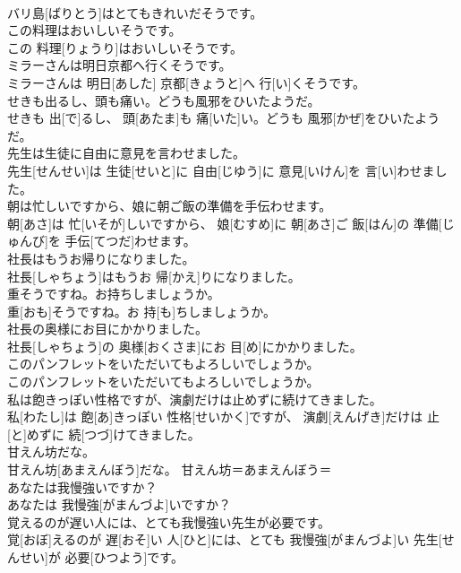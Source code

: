 \documentclass[8pt]{extreport}
\begin{document}
\begin{CJK}{UTF8}{min}
\\	バリ島[ばりとう]はとてもきれいだそうです。	
\\	この料理はおいしいそうです。	
\\	この 料理[りょうり]はおいしいそうです。	
\\	ミラーさんは明日京都へ行くそうです。	
\\	ミラーさんは 明日[あした] 京都[きょうと]へ 行[い]くそうです。	
\\	せきも出るし、頭も痛い。どうも風邪をひいたようだ。	
\\	せきも 出[で]るし、 頭[あたま]も 痛[いた]い。どうも 風邪[かぜ]をひいたようだ。	
\\	先生は生徒に自由に意見を言わせました。	
\\	先生[せんせい]は 生徒[せいと]に 自由[じゆう]に 意見[いけん]を 言[い]わせました。	
\\	朝は忙しいですから、娘に朝ご飯の準備を手伝わせます。	
\\	朝[あさ]は 忙[いそが]しいですから、 娘[むすめ]に 朝[あさ]ご 飯[はん]の 準備[じゅんび]を 手伝[てつだ]わせます。	
\\	社長はもうお帰りになりました。	
\\	社長[しゃちょう]はもうお 帰[かえ]りになりました。	
\\	重そうですね。お持ちしましょうか。	
\\	重[おも]そうですね。お 持[も]ちしましょうか。	
\\	社長の奥様にお目にかかりました。	
\\	社長[しゃちょう]の 奥様[おくさま]にお 目[め]にかかりました。	
\\	このパンフレットをいただいてもよろしいでしょうか。	
\\	このパンフレットをいただいてもよろしいでしょうか。	
\\	私は飽きっぽい性格ですが、演劇だけは止めずに続けてきました。	
\\	私[わたし]は 飽[あ]きっぽい 性格[せいかく]ですが、 演劇[えんげき]だけは 止[と]めずに 続[つづ]けてきました。	
\\	甘えん坊だな。	
\\	甘えん坊[あまえんぼう]だな。	甘えん坊＝あまえんぼう＝ 
\\	あなたは我慢強いですか？	
\\	あなたは 我慢強[がまんづよ]いですか？	
\\	覚えるのが遅い人には、とても我慢強い先生が必要です。	
\\	覚[おぼ]えるのが 遅[おそ]い 人[ひと]には、とても 我慢強[がまんづよ]い 先生[せんせい]が 必要[ひつよう]です。	

\end{CJK}
\end{document}
